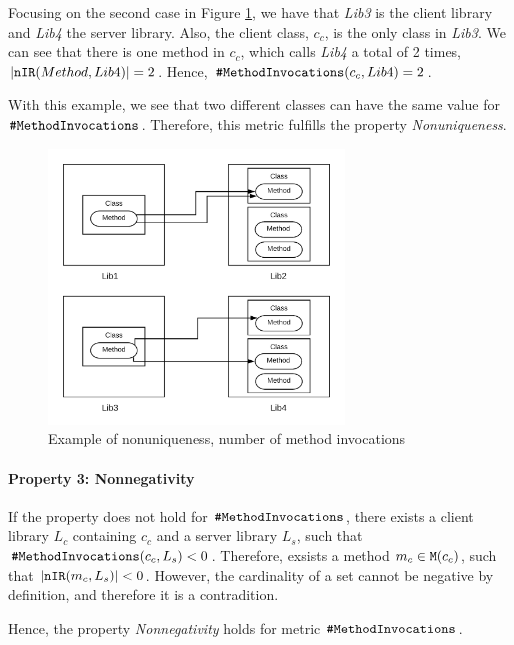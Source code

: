Focusing on the second case in Figure \ref{fig:example-nonuniqueness-method-invocation}, we have that \textit{Lib3} is the client library and \textit{Lib4} the server library. Also, the client class, $c_c$, is the only class in \textit{Lib3}. We can see that there is one method in $c_c$, which calls \textit{Lib4} a total of 2 times, $|\verb|nIR|(Method, Lib4)| = 2$. Hence, $\verb|#MethodInvocations|(c_c, Lib4) = 2$.

With this example, we see that two different classes can have the same value for $\verb|#MethodInvocations|$. Therefore, this metric fulfills the property \textit{Nonuniqueness}.

\begin{figure}[ht]
\begin{center}
\includegraphics[width=0.7\textwidth]{figures/Example-Distribution-2.png}
\caption{Example of nonuniqueness, number of method invocations}
\label{fig:example-nonuniqueness-method-invocation}
\end{center}
\end{figure}

\paragraph{Property 3: Nonnegativity}
If the property does not hold for $\verb|#MethodInvocations|$, there exists a client library $L_c$ containing $c_c$ and a server library $L_s$, such that $\verb|#MethodInvocations|(c_c, L_s)
< 0$. Therefore, exsists a method $m_c \in \verb|M|(c_c)$, such that $|\verb|nIR|(m_c, L_s)| < 0$. However, the cardinality of a set cannot be negative by definition, and therefore it is a contradition.

Hence, the property \textit{Nonnegativity} holds for metric $\verb|#MethodInvocations|$.

